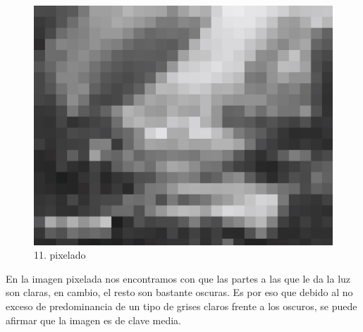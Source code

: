 \documentclass[12pt]{article}
\begin{document}
    \begin{figure}[H]
      \centering
      \includegraphics[width=\textwidth]{images/Carlos/12/Pixelart.jpg}
      \caption{\small 11. pixelado}
    \end{figure}
    En la imagen pixelada nos encontramos con que las partes a las que le da la luz son claras, en cambio, el resto son bastante oscuras. Es por eso que debido al no exceso de predominancia de un tipo de grises claros frente a los oscuros, se puede afirmar que la imagen es de clave media.
\end{document}
